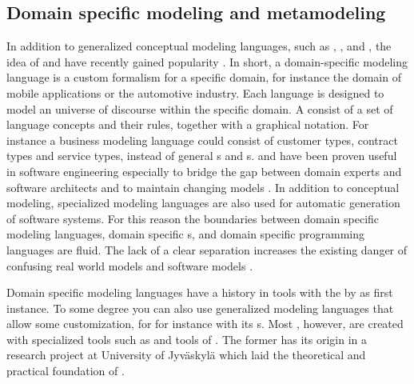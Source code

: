 \subsection{Domain specific modeling and metamodeling}
\label{sec:metamodeling}

In addition to generalized conceptual modeling languages, such as ,
, and , the idea of 
and  have recently gained popularity
\cite{Kelly2008}. In short, a domain-specific modeling language is a custom
formalism for a specific domain, for instance the domain of mobile applications
or the automotive industry. Each language is designed to model an universe of
discourse within the specific domain. A  consist of a set of language
concepts and their rules, together with a graphical notation. For instance a
business modeling language could consist of customer types, contract types and
service types, instead of general s and s.  and  have been proven useful in software
engineering especially to bridge the gap between domain experts and software
architects and to maintain changing models \cite{Cao2009}. In addition to
conceptual modeling, specialized modeling languages are also used for automatic
generation of software systems. For this reason the boundaries between domain
specific modeling languages, domain specific s, and
domain specific programming languages are fluid. The lack of a clear separation
increases the existing danger of confusing real world models and software
models \cite{Genova2005}.

Domain specific modeling languages have a history in  tools with the  by \textcite{Teichroew1977} as
first instance. To some degree you can also use generalized modeling languages
that allow some customization, for for instance  with its
s. Most , however, are created with specialized
 tools such as  \cite{Kelly2008} and 
 tools of  \cite{Cook2007}.
The former has its origin in a research project at University of Jyv\"askyl\"a
which laid the theoretical and practical foundation of .

